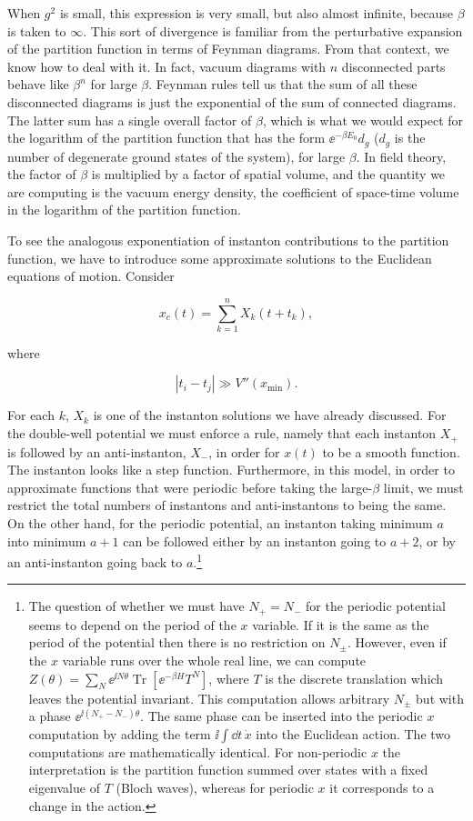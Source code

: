 When $g^2$ is small, this expression is very small, but also almost infinite,
because $\beta$ is taken to $\infty$. This sort of divergence is familiar from
the perturbative expansion of the partition function in terms of Feynman
diagrams. From that context, we know how to deal with it. In fact, vacuum
diagrams with $n$ disconnected parts behave like $\beta^n$ for large $\beta$.
Feynman rules tell us that the sum of all these disconnected diagrams is just the
exponential of the sum of connected diagrams. The latter sum has a single
overall factor of $\beta$, which is what we would expect for the logarithm of the
partition function that has the form $\ee^{-\beta E_0}d_g$ ($d_g$ is the number
of degenerate ground states of the system), for large $\beta$. In field theory,
the factor of $\beta$ is multiplied by a factor of spatial volume, and the
quantity we are computing is the vacuum energy density, the coefficient of
space-time volume in the logarithm of the partition function.

To see the analogous exponentiation of instanton contributions to the partition
function, we have to introduce some approximate solutions to the Euclidean
equations of motion. Consider

\[
  x_c(t)=\sum_{k=1}^{n}X_k(t+t_k),
\]

where

\[
  |t_i-t_j|\gg V''(x_{\min}).
\]

For each $k$, $X_k$ is one of the instanton solutions we have already
discussed. For the double-well potential we must enforce a rule, namely that
each instanton $X_+$ is followed by an anti-instanton, $X_-$, in order for
$x(t)$ to be a smooth function. The instanton looks like a step function.
Furthermore, in this model, in order to approximate functions that were periodic
before taking the large-$\beta$ limit, we must restrict the total numbers of
instantons and anti-instantons to being the same. On the other hand, for the
periodic potential, an instanton taking minimum $a$ into minimum $a+1$ can be
followed either by an instanton going to $a+2$, or by an anti-instanton going
back to $a$.\footnote[2]{The question of whether we must have $N_+=N_-$ for the
periodic potential seems to depend on the period of the $x$ variable. If it is
the same as the period of the potential then there is no restriction on
$N_\pm$. However, even if the $x$ variable runs over the whole real line, we can
compute $Z(\theta)=\sum_N\ee^{\ii N\theta}\operatorname{Tr}[\ee^{-\beta H}T^N]$,
where $T$ is the discrete translation which leaves the potential invariant.
This computation allows arbitrary $N_\pm$ but with a phase
$\ee^{\ii(N_+-N_-)\theta}$. The same phase can be inserted into the periodic
$x$ computation by adding the term $\ii\int\dd t\,\dot x$ into the Euclidean
action. The two computations are mathematically identical. For non-periodic $x$
the interpretation is the partition function summed over states with a fixed
eigenvalue of $T$ (Bloch waves), whereas for periodic $x$ it corresponds to a
change in the action.}

